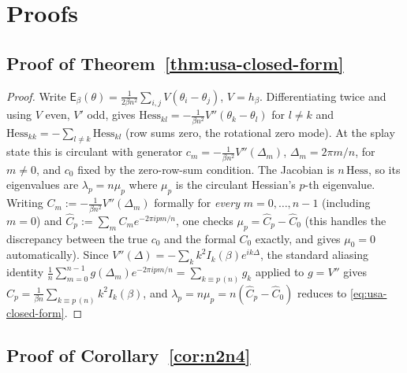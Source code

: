 \documentclass[11pt]{article}
\begin{document}
\appendix
\section{Proofs}
\label{app:proofs}

\subsection{Proof of Theorem~\ref{thm:usa-closed-form}}
\label{app:usa-closed-form}

\begin{proof}
Write $\mathsf{E}_\beta(\theta) = \frac{1}{2\beta n^2}\sum_{i,j}V(\theta_i-\theta_j)$, $V=h_\beta$. Differentiating twice and using $V$ even, $V'$ odd, gives $\mathrm{Hess}_{kl} = -\frac{1}{\beta n^2}V''(\theta_k-\theta_l)$ for $l\ne k$ and $\mathrm{Hess}_{kk}=-\sum_{l\ne k}\mathrm{Hess}_{kl}$ (row sums zero, the rotational zero mode). At the splay state this is circulant with generator $c_m=-\frac{1}{\beta n^2}V''(\Delta_m)$, $\Delta_m=2\pi m/n$, for $m\ne0$, and $c_0$ fixed by the zero-row-sum condition. The Jacobian is $n\,\mathrm{Hess}$, so its eigenvalues are $\lambda_p = n\mu_p$ where $\mu_p$ is the circulant Hessian's $p$-th eigenvalue. Writing $C_m := -\frac{1}{\beta n^2}V''(\Delta_m)$ formally for \emph{every} $m=0,\dots,n-1$ (including $m=0$) and $\hat C_p:=\sum_m C_m e^{-2\pi i pm/n}$, one checks $\mu_p = \hat C_p - \hat C_0$ (this handles the discrepancy between the true $c_0$ and the formal $C_0$ exactly, and gives $\mu_0=0$ automatically). Since $V''(\Delta)=-\sum_k k^2 I_k(\beta)e^{ik\Delta}$, the standard aliasing identity $\frac1n\sum_{m=0}^{n-1}g(\Delta_m)e^{-2\pi ipm/n}=\sum_{k\equiv p\,(n)}\hat g_k$ applied to $g=V''$ gives $\hat C_p = \frac{1}{\beta n}\sum_{k\equiv p\,(n)}k^2I_k(\beta)$, and $\lambda_p=n\mu_p=n(\hat C_p-\hat C_0)$ reduces to \eqref{eq:usa-closed-form}.
\end{proof}

\subsection{Proof of Corollary~\ref{cor:n2n4}}
\label{app:n2n4}
\end{document}
